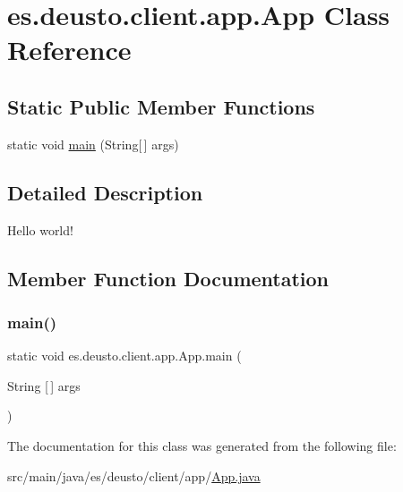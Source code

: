 \hypertarget{classes_1_1deusto_1_1client_1_1app_1_1_app}{}\section{es.\+deusto.\+client.\+app.\+App Class Reference}
\label{classes_1_1deusto_1_1client_1_1app_1_1_app}
\subsection*{Static Public Member Functions}
\begin{DoxyCompactItemize}
\item 
static void \mbox{\hyperlink{classes_1_1deusto_1_1client_1_1app_1_1_app_a48d04b93a829e568df4db676bc46d84a}{main}} (String\mbox{[}$\,$\mbox{]} args)
\end{DoxyCompactItemize}


\subsection{Detailed Description}
Hello world! 

\subsection{Member Function Documentation}
\mbox{\label{classes_1_1deusto_1_1client_1_1app_1_1_app_a48d04b93a829e568df4db676bc46d84a}} 
\subsubsection{\texorpdfstring{main()}{main()}}
{\footnotesize\ttfamily static void es.\+deusto.\+client.\+app.\+App.\+main (\begin{DoxyParamCaption}\item[{String \mbox{[}$\,$\mbox{]}}]{args }\end{DoxyParamCaption})\hspace{0.3cm}{\ttfamily [static]}}



The documentation for this class was generated from the following file\+:\begin{DoxyCompactItemize}
\item 
src/main/java/es/deusto/client/app/\mbox{\hyperlink{_app_8java}{App.\+java}}\end{DoxyCompactItemize}
